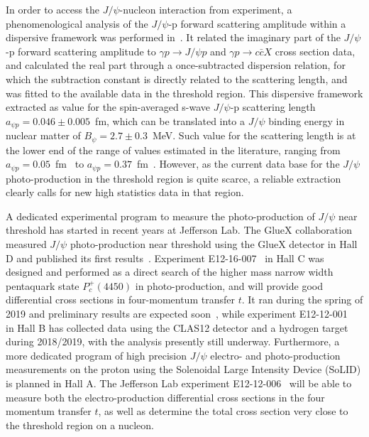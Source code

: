 \documentclass[prd,amsmath,%
twocolumn,floatfix,amssymb, preprintnumbers, linenumbers,nofootinbib, superscriptaddress]{revtex4}
\begin{document}
In order to access the $J/\psi$-nucleon interaction from experiment, a phenomenological analysis of the $J/\psi$-p forward scattering amplitude within a dispersive framework was performed in~\cite{Gryniuk:2016mpk}. It related the imaginary part of the $J/\psi$-p forward scattering amplitude 
to $\gamma p \to J/\psi p$ and $\gamma p \to c \bar c X$ cross section data, and calculated the real part through a once-subtracted dispersion relation, for which the subtraction constant is directly related to the scattering length, and was fitted to the available data in the threshold region.   
This dispersive framework extracted as value for the spin-averaged s-wave $J/\psi$-p scattering length $a_{\psi p} = 0.046 \pm 0.005$~fm, which can be translated into a 
$J/\psi$ binding energy in nuclear matter 
of $B_{\psi} = 2.7 \pm 0.3$~MeV. Such value for the scattering length is at the lower end of the range of values estimated in the literature, ranging from 
$a_{\psi p} = 0.05$~fm~\cite{Kaidalov:1992hd} to 
$a_{\psi p} = 0.37$~fm~\cite{Sibirtsev:2005ex}. However, as the current data base for the $J/\psi$ photo-production in the threshold region is quite scarce, a reliable extraction clearly calls for new high statistics data in that region.  

A dedicated experimental program to measure the  photo-production of $J/\psi$ near threshold  has started in recent years at Jefferson Lab. The GlueX collaboration measured $J/\psi$ photo-production near threshold using the GlueX detector in Hall D and published its first  results~\cite{Ali:2019lzf}. Experiment E12-16-007~\cite{Meziani:2016lhg} in Hall C was designed and performed as a direct search of the higher mass narrow width pentaquark state $P_c^+(4450)$ in photo-production, and will provide good differential cross sections in four-momentum transfer $t$. It ran during the spring of 2019 and preliminary results are expected soon~\cite{Joosten:2020}, while experiment E12-12-001~\cite{CLAS12-tcs:proposal} in Hall B has collected data using the CLAS12 detector and a hydrogen target during  2018/2019, with the analysis presently still underway. Furthermore, a more dedicated program of high precision $J/\psi$ electro- and photo-production  measurements on the proton  using the Solenoidal Large Intensity Device (SoLID) is planned in Hall A. The Jefferson Lab experiment E12-12-006~\cite{SoLIDjpsi:proposal} will be able to measure both the electro-production differential cross sections in the four momentum transfer $t$, as well as determine the total cross section very close to the threshold region on a nucleon.  
\end{document}
